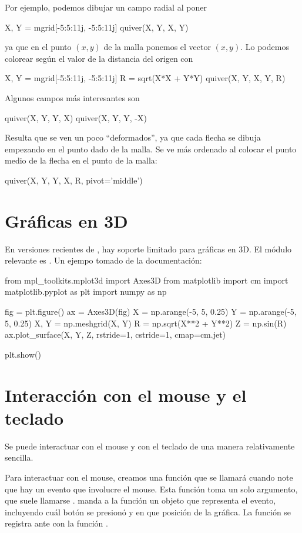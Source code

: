 Por ejemplo, podemos dibujar un campo radial al poner
\begin{python}
X, Y = mgrid[-5:5:11j, -5:5:11j]
quiver(X, Y, X, Y)
\end{python}
ya que en el punto $(x,y)$ de la malla ponemos el vector $(x,y)$.
Lo podemos colorear según el valor de la distancia del origen con
\begin{python}
X, Y = mgrid[-5:5:11j, -5:5:11j]
R =  sqrt(X*X + Y*Y)
quiver(X, Y, X, Y, R)
\end{python}


Algunos campos más interesantes son
\begin{python}
quiver(X, Y, Y, X)
quiver(X, Y, Y, -X)
\end{python}
Resulta que se ven un poco ``deformados'', ya que cada flecha se dibuja empezando en el punto dado de la malla.
Se ve más ordenado al colocar el punto medio de la flecha en el punto de la malla:
\begin{python}
quiver(X, Y, Y, X, R,  pivot='middle')
\end{python}










\section{Gráficas en 3D}
En versiones recientes de , hay soporte limitado para gráficas en 3D. 
El módulo relevante es .
Un ejempo tomado de la documentación:
\begin{python}
from mpl_toolkits.mplot3d import Axes3D
from matplotlib import cm
import matplotlib.pyplot as plt
import numpy as np

fig = plt.figure()
ax = Axes3D(fig)
X = np.arange(-5, 5, 0.25)
Y = np.arange(-5, 5, 0.25)
X, Y = np.meshgrid(X, Y)
R = np.sqrt(X**2 + Y**2)
Z = np.sin(R)
ax.plot_surface(X, Y, Z, rstride=1, cstride=1, cmap=cm.jet)

plt.show()
\end{python}

\section{Interacción con el mouse y el teclado}
Se puede interactuar con el mouse y con el teclado de una manera relativamente sencilla.

Para interactuar con el mouse, creamos una función que se llamará cuando  note que hay un evento que involucre el mouse.
Esta función toma un solo argumento, que suele llamarse .  manda a la función un objeto que representa el evento, incluyendo cuál botón se
presionó y en que posición de la gráfica. La función se registra ante  con la función .

